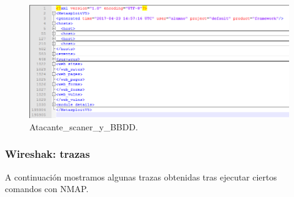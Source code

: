 \documentclass[a4,12pt,onecolum]{article}
\begin{document}
\begin{figure}[htbp]
\centering
\includegraphics[width=1.0\textwidth]{./images/Atacante_scaner_y_BBDD.png}
\caption{Atacante\_scaner\_y\_BBDD.}
\label{fig:nmap4}
\end{figure}


\subsubsection{Wireshak: trazas}

A continuación mostramos algunas trazas obtenidas tras ejecutar ciertos comandos con NMAP.
\end{document}
